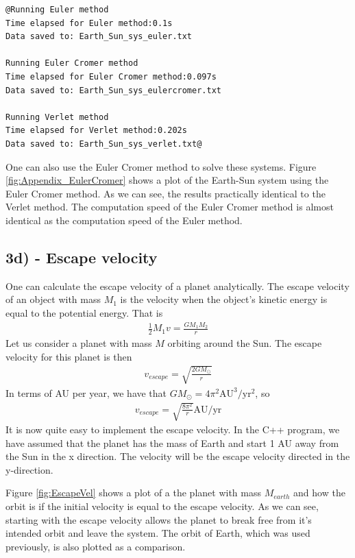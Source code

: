 \documentclass[12pt]{article}
\begin{document}
\begin{lstlisting}
@Running Euler method
Time elapsed for Euler method:0.1s
Data saved to: Earth_Sun_sys_euler.txt

Running Euler Cromer method
Time elapsed for Euler Cromer method:0.097s
Data saved to: Earth_Sun_sys_eulercromer.txt

Running Verlet method
Time elapsed for Verlet method:0.202s
Data saved to: Earth_Sun_sys_verlet.txt@
\end{lstlisting}

One can also use the Euler Cromer method to solve these systems. Figure \ref{fig:Appendix_EulerCromer} shows a plot of the Earth-Sun system using the Euler Cromer method. As we can see, the results practically identical to the Verlet method. The computation speed of the Euler Cromer method is almost identical as the computation speed of the Euler method.
\FloatBarrier

\subsection*{3d) - Escape velocity}
One can calculate the escape velocity of a planet analytically. The escape velocity of an object with mass $M_1$ is the velocity when the object's kinetic energy is equal to the potential energy. That is
\begin{align*}
\frac{1}{2}M_1v = \frac{GM_1M_2}{r}
\end{align*}
Let us consider a planet with mass $M$ orbiting around the Sun. The escape velocity for this planet is then
\begin{align*}
v_{escape} = \sqrt{\frac{2GM_{\odot}}{r}}
\end{align*}
In terms of AU per year, we have that $GM_{\odot} = 4\pi^2 \text{AU}^3/\text{yr}^2$, so
\begin{align*}
v_{escape} = \sqrt{\frac{8\pi^2}{r}} \text{AU}/\text{yr}
\end{align*}
It is now quite easy to implement the escape velocity. In the C++ program, we have assumed that the planet has the mass of Earth and start 1 AU away from the Sun in the x direction. The velocity will be the escape velocity directed in the y-direction. 

Figure \ref{fig:EscapeVel} shows a plot of a the planet with mass $M_{earth}$ and how the orbit is if the initial velocity is equal to the escape velocity. As we can see, starting with the escape velocity allows the planet to break free from it's intended orbit and leave the system. The orbit of Earth, which was used previously, is also plotted as a comparison.
\end{document}
